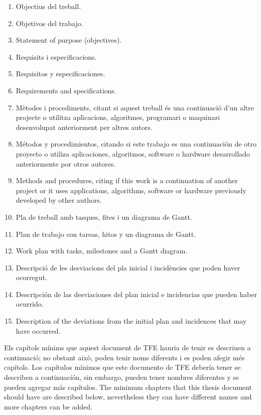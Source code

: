 \begin{enumerate}
  \ifcase\doclanguage
  \or
    \item Objectius del treball.
  \or
    \item Objetivos del trabajo.
  \else
    \item Statement of purpose (objectives).
  \fi

  \ifcase\doclanguage
  \or
    \item Requisits i especificacions.
  \or
    \item Requisitos y especificaciones.
  \else
    \item Requirements and specifications.
  \fi

  \ifcase\doclanguage
  \or
    \item Mètodes i procediments, citant si aquest treball és una continuació d'un altre projecte o utilitza aplicacions, algoritmes, programari o maquinari desenvolupat anteriorment per altres autors.
  \or
    \item Métodos y procedimientos, citando si este trabajo es una continuación de otro proyecto o utiliza aplicaciones, algoritmos, software o hardware desarrollado anteriormente por otros autores.
  \else
    \item Methods and procedures, citing if this work is a continuation of another project or it uses applications, algorithms, software or hardware previously developed by other authors.
  \fi

  \ifcase\doclanguage
  \or
    \item Pla de treball amb tasques, fites i un diagrama de Gantt.
  \or
    \item Plan de trabajo con tareas, hitos y un diagrama de Gantt.
  \else
    \item Work plan with tasks, milestones and a Gantt diagram.
  \fi

  \ifcase\doclanguage
  \or
    \item Descripció de les desviacions del pla inicial i incidències que poden haver ocorregut.
  \or
    \item Descripción de las desviaciones del plan inicial e incidencias que pueden haber ocurrido.
  \else
    \item Description of the deviations from the initial plan and incidences that may have occurred.
  \fi
\end{enumerate}

\ifcase\doclanguage
\or
  Els capítols mínims que aquest document de TFE hauria de tenir es descriuen a continuació; no obstant això, poden tenir noms diferents i es poden afegir més capítols.
\or
  Los capítulos mínimos que este documento de TFE debería tener se describen a continuación, sin embargo, pueden tener nombres diferentes y se pueden agregar más capítulos.
\else
  The minimum chapters that this thesis document should have are described below, nevertheless they can have different names and more chapters can be added.
\fi

